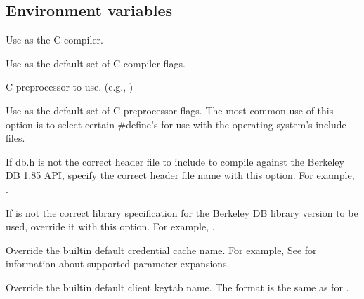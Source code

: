 \documentclass[letterpaper,10pt,english]{sphinxmanual}
\begin{document}
\subsection{Environment variables}
\label{\detokenize{build/options2configure:environment-variables}}\begin{description}
\sphinxAtStartPar
Use  as the C compiler.

\sphinxAtStartPar
Use  as the default set of C compiler flags.

\sphinxAtStartPar
C preprocessor to use. (e.g., )

\sphinxAtStartPar
Use  as the default set of C preprocessor flags.  The
most common use of this option is to select certain \#define’s for
use with the operating system’s include files.

\sphinxAtStartPar
If db.h is not the correct header file to include to compile
against the Berkeley DB 1.85 API, specify the correct header file
name with this option. For example, .

\sphinxAtStartPar
If  is not the correct library specification for the
Berkeley DB library version to be used, override it with this
option. For example, .

\sphinxAtStartPar
Override the built\sphinxhyphen{}in default credential cache name.
For example, 
See  for information about supported
parameter expansions.

\sphinxAtStartPar
Override the built\sphinxhyphen{}in default client keytab name.
The format is the same as for .


\end{description}
\end{document}
